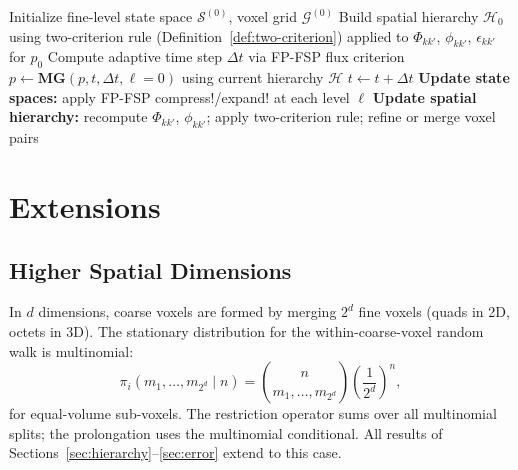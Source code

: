 \documentclass[review,onefignum,onetabnum]{siamart171218}
\newcommand{\calS}{\mathcal{S}}
\newcommand{\calH}{\mathcal{H}}
\begin{document}
\begin{algorithm}[H]
  \caption{Adaptive Multigrid RDME-FSP}
  \label{alg:adaptive}
  \begin{algorithmic}[1]
    \STATE Initialize fine-level state space $\calS^{(0)}$,
      voxel grid $\mathcal{G}^{(0)}$
    \STATE Build spatial hierarchy $\calH_0$ using two-criterion
      rule (Definition~\ref{def:two-criterion}) applied to
      $\Phi_{kk'}$, $\phi_{kk'}$, $\epsilon_{kk'}$ for $p_0$
      \STATE Compute adaptive time step $\Delta t$ via FP-FSP
        flux criterion \cite{Dhumuntarao2024}
      \STATE $p \leftarrow \mathbf{MG}(p, t, \Delta t, \ell=0)$
        using current hierarchy $\calH$
      \STATE $t \leftarrow t + \Delta t$
      \STATE \textbf{Update state spaces:} apply FP-FSP
        compress!/expand! at each level $\ell$
      \STATE \textbf{Update spatial hierarchy:}
        recompute $\Phi_{kk'}$, $\phi_{kk'}$; apply
        two-criterion rule; refine or merge voxel pairs
    \ENDWHILE
  \end{algorithmic}
\end{algorithm}

\section{Extensions}
\label{sec:extensions}

\subsection{Higher Spatial Dimensions}

In $d$ dimensions, coarse voxels are formed by merging $2^d$
fine voxels (quads in 2D, octets in 3D).  The stationary
distribution for the within-coarse-voxel random walk is
multinomial:
\begin{equation}
  \pi_i(m_1,\ldots,m_{2^d} \mid n)
  = \binom{n}{m_1,\ldots,m_{2^d}} \left(\frac{1}{2^d}\right)^n,
\end{equation}
for equal-volume sub-voxels.  The restriction operator sums over
all multinomial splits; the prolongation uses the multinomial
conditional.  All results of Sections~\ref{sec:hierarchy}--\ref{sec:error}
extend to this case.
\end{document}

